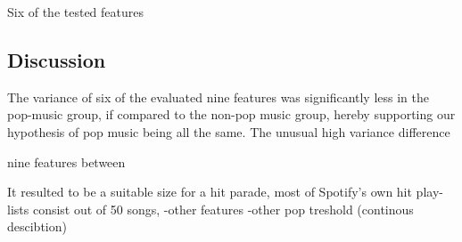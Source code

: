 \documentclass{article}
\begin{document}

Six of the tested features  %

\subsection{Discussion}
The variance of six of the evaluated nine features was significantly less in the pop-music group, if compared to the non-pop music group, hereby supporting our hypothesis of pop music being all the same.  
The unusual high variance difference 


nine features between 




 It resulted  to be a suitable size for a hit parade, most of Spotify's own hit play-lists consist out of 50 songs, 
-other features
-other pop treshold (continous descibtion)



\end{document}
